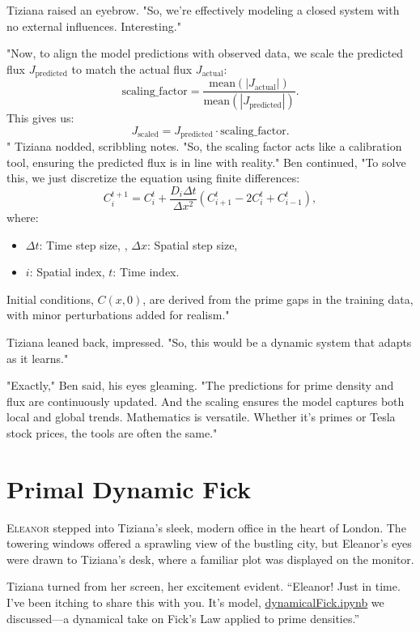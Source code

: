 Tiziana raised an eyebrow. "So, we’re effectively modeling a closed system with no external influences. Interesting."

"Now, to align the model predictions with observed data, we scale the predicted flux \(J_\text{predicted}\) to match the actual flux \(J_\text{actual}\):
\[
\text{scaling\_factor} = \frac{\text{mean}(|J_\text{actual}|)}{\text{mean}(|J_\text{predicted}|)}.
\]
This gives us:
\[
J_\text{scaled} = J_\text{predicted} \cdot \text{scaling\_factor}.
\]"
Tiziana nodded, scribbling notes. "So, the scaling factor acts like a calibration tool, ensuring the predicted flux is in line with reality." Ben continued, "To solve this, we just discretize the equation using finite differences:
\[
C^{t+1}_i = C^t_i + \frac{D_i \Delta t}{\Delta x^2} \left( C^t_{i+1} - 2C^t_i + C^t_{i-1} \right),
\]
where:
\begin{itemize}
    \item \( \Delta t \): Time step size, \quad, \( \Delta x \): Spatial step size,
    \item \( i \): Spatial index, \( t \): Time index.
\end{itemize}
Initial conditions, \(C(x, 0)\), are derived from the prime gaps in the training data, with minor perturbations added for realism."

Tiziana leaned back, impressed. "So, this would be a dynamic system that adapts as it learns."

"Exactly," Ben said, his eyes gleaming. "The predictions for prime density and flux are continuously updated. And the scaling ensures the model captures both local and global trends. Mathematics is versatile. Whether it’s primes or Tesla stock prices, the tools are often the same."


\section*{Primal Dynamic Fick}

\lettrine{E}{leanor} stepped into Tiziana’s sleek, modern office in the heart of London. The towering windows offered a sprawling view of the bustling city, but Eleanor’s eyes were drawn to Tiziana’s desk, where a familiar plot was displayed on the monitor.

Tiziana turned from her screen, her excitement evident. “Eleanor! Just in time. I’ve been itching to share this with you. It’s model, \href{https://colab.research.google.com/drive/194d9ivQPFXiWMbE9Bz1sHXyh6B6ee478?usp=sharing}{dynamicalFick.ipynb}  we discussed—a dynamical take on Fick’s Law applied to prime densities.”

